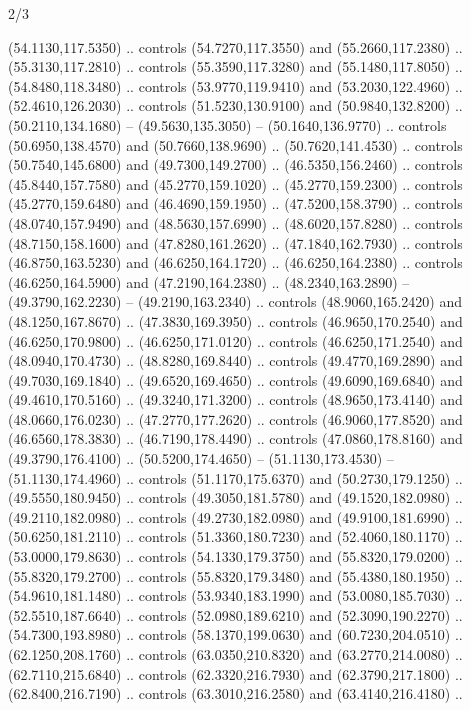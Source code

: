 \begin{flagdescription}{2/3}
\begin{scope}[xshift=0.5\flaglength,yshift=0.5\flagwidth,scale=\stretchfactor]
\begin{scope}[scale=0.001645\flagwidth,yshift=65mm,xshift=-63mm]
\begin{scope}[y=0.80pt, x=0.80pt, yscale=-1,]
\begin{scope}[cm={{1.33333,0.0,0.0,1.33333,(0.0,1e-05)}}]
  (54.1130,117.5350) .. controls (54.7270,117.3550) and (55.2660,117.2380) ..
  (55.3130,117.2810) .. controls (55.3590,117.3280) and (55.1480,117.8050) ..
  (54.8480,118.3480) .. controls (53.9770,119.9410) and (53.2030,122.4960) ..
  (52.4610,126.2030) .. controls (51.5230,130.9100) and (50.9840,132.8200) ..
  (50.2110,134.1680) -- (49.5630,135.3050) -- (50.1640,136.9770) .. controls
  (50.6950,138.4570) and (50.7660,138.9690) .. (50.7620,141.4530) .. controls
  (50.7540,145.6800) and (49.7300,149.2700) .. (46.5350,156.2460) .. controls
  (45.8440,157.7580) and (45.2770,159.1020) .. (45.2770,159.2300) .. controls
  (45.2770,159.6480) and (46.4690,159.1950) .. (47.5200,158.3790) .. controls
  (48.0740,157.9490) and (48.5630,157.6990) .. (48.6020,157.8280) .. controls
  (48.7150,158.1600) and (47.8280,161.2620) .. (47.1840,162.7930) .. controls
  (46.8750,163.5230) and (46.6250,164.1720) .. (46.6250,164.2380) .. controls
  (46.6250,164.5900) and (47.2190,164.2380) .. (48.2340,163.2890) --
  (49.3790,162.2230) -- (49.2190,163.2340) .. controls (48.9060,165.2420) and
  (48.1250,167.8670) .. (47.3830,169.3950) .. controls (46.9650,170.2540) and
  (46.6250,170.9800) .. (46.6250,171.0120) .. controls (46.6250,171.2540) and
  (48.0940,170.4730) .. (48.8280,169.8440) .. controls (49.4770,169.2890) and
  (49.7030,169.1840) .. (49.6520,169.4650) .. controls (49.6090,169.6840) and
  (49.4610,170.5160) .. (49.3240,171.3200) .. controls (48.9650,173.4140) and
  (48.0660,176.0230) .. (47.2770,177.2620) .. controls (46.9060,177.8520) and
  (46.6560,178.3830) .. (46.7190,178.4490) .. controls (47.0860,178.8160) and
  (49.3790,176.4100) .. (50.5200,174.4650) -- (51.1130,173.4530) --
  (51.1130,174.4960) .. controls (51.1170,175.6370) and (50.2730,179.1250) ..
  (49.5550,180.9450) .. controls (49.3050,181.5780) and (49.1520,182.0980) ..
  (49.2110,182.0980) .. controls (49.2730,182.0980) and (49.9100,181.6990) ..
  (50.6250,181.2110) .. controls (51.3360,180.7230) and (52.4060,180.1170) ..
  (53.0000,179.8630) .. controls (54.1330,179.3750) and (55.8320,179.0200) ..
  (55.8320,179.2700) .. controls (55.8320,179.3480) and (55.4380,180.1950) ..
  (54.9610,181.1480) .. controls (53.9340,183.1990) and (53.0080,185.7030) ..
  (52.5510,187.6640) .. controls (52.0980,189.6210) and (52.3090,190.2270) ..
  (54.7300,193.8980) .. controls (58.1370,199.0630) and (60.7230,204.0510) ..
  (62.1250,208.1760) .. controls (63.0350,210.8320) and (63.2770,214.0080) ..
  (62.7110,215.6840) .. controls (62.3320,216.7930) and (62.3790,217.1800) ..
  (62.8400,216.7190) .. controls (63.3010,216.2580) and (63.4140,216.4180) ..

\end{scope}
\end{scope}
\end{scope}
\end{scope}
\end{flagdescription}
